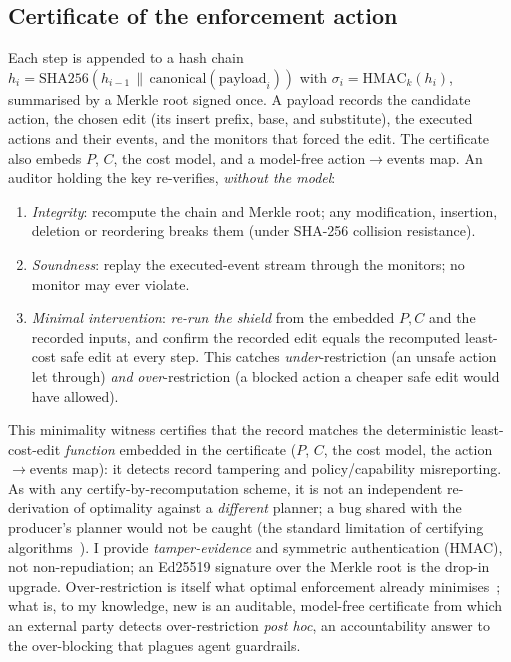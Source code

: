 \documentclass[11pt]{article}
\begin{document}
\subsection{Certificate of the enforcement action}
\label{sec:cert}
Each step is appended to a hash chain $h_i=\mathrm{SHA256}(h_{i-1}\,\|\,
\mathrm{canonical}(\text{payload}_i))$ with $\sigma_i=\mathrm{HMAC}_k(h_i)$,
summarised by a Merkle root signed once. A payload records the candidate action,
the chosen edit (its insert prefix, base, and substitute), the executed actions
and their events, and the monitors that forced the edit. The certificate also
embeds $P$, $C$, the cost model, and a model-free action$\to$events map. An
auditor holding the key re-verifies, \emph{without the model}:
\begin{enumerate}[leftmargin=1.4em,itemsep=1pt]
\item \emph{Integrity}: recompute the chain and Merkle root; any modification,
insertion, deletion or reordering breaks them (under SHA-256 collision
resistance).
\item \emph{Soundness}: replay the executed-event stream through the monitors;
no monitor may ever violate.
\item \emph{Minimal intervention}: \emph{re-run the shield} from the embedded
$P,C$ and the recorded inputs, and confirm the recorded edit equals the recomputed
least-cost safe edit at every step. This catches \emph{under}-restriction (an
unsafe action let through) \emph{and} \emph{over}-restriction (a blocked action a
cheaper safe edit would have allowed).
\end{enumerate}
This minimality witness certifies that the record matches the deterministic
least-cost-edit \emph{function} embedded in the certificate ($P$, $C$, the cost
model, the action$\to$events map): it detects record tampering and
policy/capability misreporting. As with any certify-by-recomputation scheme, it is
not an independent re-derivation of optimality against a \emph{different} planner;
a bug shared with the producer's planner would not be caught (the standard
limitation of certifying algorithms~\citep{mcconnell2011certifying}). I provide
\emph{tamper-evidence} and symmetric authentication (HMAC), not non-repudiation; an
Ed25519 signature over the Merkle root is the drop-in upgrade. Over-restriction is
itself what optimal enforcement already
minimises~\citep{pandya2019optimal,gallay2021decentralized}; what is, to my
knowledge, new is an auditable, model-free certificate from which an external party
detects over-restriction \emph{post hoc}, an accountability answer to the
over-blocking that plagues agent guardrails.
\end{document}
